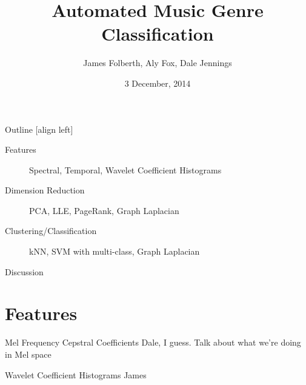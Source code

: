 \documentclass[xcolor=dvipsnames,t]{beamer} %
\title{Automated Music Genre Classification}
\date{3 December, 2014}
\author{James Folberth, Aly Fox, Dale Jennings}
\begin{document}
\begin{frame}
\maketitle
\end{frame}


\begin{frame}{Outline}
   [align left] %
   \begin{description}                              %
      \item[Features] Spectral, Temporal, Wavelet Coefficient Histograms\\
      \item[Dimension Reduction] PCA, LLE, PageRank, Graph Laplacian\\
      \item[Clustering/Classification] kNN, SVM with multi-class, Graph Laplacian\\
      \item[Discussion]
   \end{description}

\end{frame}



\section{Features}
\begin{frame}{Mel Frequency Cepstral Coefficients}
   Dale, I guess.  Talk about what we're doing in Mel space

\end{frame}

\begin{frame}{Wavelet Coefficient Histograms}
James
\end{frame}
\end{document}
